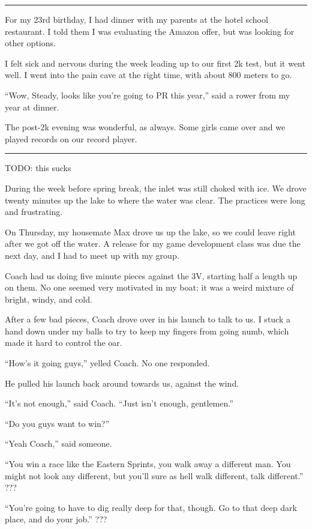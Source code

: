 \plainfancybreak{12pt}{2}{* * *}

For my 23rd birthday, I had dinner with my parents at the hotel school
restaurant.  I told them I was evaluating the Amazon offer, but was looking for
other options.


I felt sick and nervous during the week leading up to our first 2k test, but it
went well.  I went into the pain cave at the right time, with about 800 meters
to go.  

``Wow, Steady, looks like you're going to PR this year,'' said a rower from my
year at dinner.  

The post-2k evening was wonderful, as always.  Some girls came over and we
played records on our record player.  

\plainfancybreak{12pt}{2}{* * *}

TODO: this sucks

During the week before spring break, the inlet was still choked with ice. We
drove twenty minutes up the lake to where the water was clear.  The practices
were long and frustrating.

On Thursday, my housemate Max drove us up the lake, so we could leave right
after we got off the water.  A release for my game development class was due the
next day, and I had to meet up with my group.

Coach had us doing five minute pieces against the 3V, starting half a
length up on them.  No one seemed very motivated in my boat: it was a weird
mixture of bright, windy, and cold. 

After a few bad pieces, Coach drove over in his launch to talk to us.  I stuck a
hand down under my balls to try to keep my fingers from going numb, which made
it hard to control the oar.

``How's it going guys,'' yelled Coach.  No one responded.

He pulled his launch back around towards us, against the wind.

``It's not enough,'' said Coach.  ``Just isn't enough, gentlemen.''

``Do you guys want to win?''

``Yeah Coach,'' said someone.

``You win a race like the Eastern Sprints, you walk away a different man.  You
might not look any different, but you'll sure as hell walk different, talk
different.'' ???

``You're going to have to dig really deep for that, though.  Go to that deep
dark place, and do your job.''  ???

